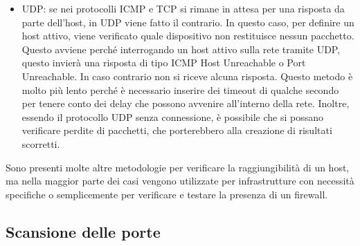 \documentclass[12pt]{report}
\begin{document}
\begin{itemize}
\begin{itemize}
    \end{itemize}
    \item UDP: se nei protocolli ICMP e TCP si rimane in attesa per una risposta da parte dell'host, in UDP viene fatto il contrario. In questo caso, per definire un host attivo, viene verificato quale dispositivo non restituisce nessun pacchetto. Questo avviene perché interrogando un host attivo sulla rete tramite UDP, questo invierà una risposta di tipo ICMP Host Unreachable o Port Unreachable. In caso contrario non si riceve alcuna risposta. Questo metodo è molto più lento perché è necessario inserire dei timeout di qualche secondo per tenere conto dei delay che possono avvenire all'interno della rete. Inoltre, essendo il protocollo UDP senza connessione, è possibile che si possano verificare perdite di pacchetti, che porterebbero alla creazione di risultati scorretti.
\end{itemize}
Sono presenti molte altre metodologie per verificare la raggiungibilità di un host, ma nella maggior parte dei casi vengono utilizzate per infrastrutture con necessità specifiche o semplicemente per verificare e testare la presenza di un firewall.

\subsection{Scansione delle porte}
\end{document}
